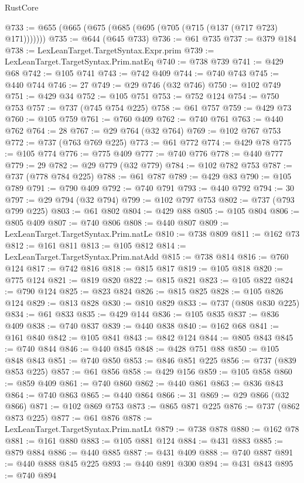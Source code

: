 \begin{lexlean}{RustCore}
\begin{coremodule}
{\begin{coremodule}
{{{{{{{{{{{{{{{{{{{{{{{{{{{{{{{{{{{{{{{{{{{{@733 := @655 (@665 (@675 (@685 (@695 (@705 (@715 (@137 (@717 @723) @171)))))))
@735 := @644 (@645 @733)
@736 := @61 @735
@737 := @379 @184
@738 := LexLeanTarget.TargetSyntax.Expr.prim
@739 := LexLeanTarget.TargetSyntax.Prim.natEq
@740 := @738 @739
@741 := @429 @68
@742 := @105 @741
@743 := @742 @409
@744 := @740 @743
@745 := @440 @744
@746 := 27
@749 := @29 @746 (@32 @746)
@750 := @102 @749
@751 := @429 @34
@752 := @105 @751
@753 := @752 @124
@754 := @750 @753
@757 := @737 (@745 @754 @225)
@758 := @61 @757
@759 := @429 @73
@760 := @105 @759
@761 := @760 @409
@762 := @740 @761
@763 := @440 @762
@764 := 28
@767 := @29 @764 (@32 @764)
@769 := @102 @767 @753
@772 := @737 (@763 @769 @225)
@773 := @61 @772
@774 := @429 @78
@775 := @105 @774
@776 := @775 @409
@777 := @740 @776
@778 := @440 @777
@779 := 29
@782 := @29 @779 (@32 @779)
@784 := @102 @782 @753
@787 := @737 (@778 @784 @225)
@788 := @61 @787
@789 := @429 @83
@790 := @105 @789
@791 := @790 @409
@792 := @740 @791
@793 := @440 @792
@794 := 30
@797 := @29 @794 (@32 @794)
@799 := @102 @797 @753
@802 := @737 (@793 @799 @225)
@803 := @61 @802
@804 := @429 @88
@805 := @105 @804
@806 := @805 @409
@807 := @740 @806
@808 := @440 @807
@809 := LexLeanTarget.TargetSyntax.Prim.natLe
@810 := @738 @809
@811 := @162 @73
@812 := @161 @811
@813 := @105 @812
@814 := LexLeanTarget.TargetSyntax.Prim.natAdd
@815 := @738 @814
@816 := @760 @124
@817 := @742 @816
@818 := @815 @817
@819 := @105 @818
@820 := @775 @124
@821 := @819 @820
@822 := @815 @821
@823 := @105 @822
@824 := @790 @124
@825 := @823 @824
@826 := @815 @825
@828 := @105 @826 @124
@829 := @813 @828
@830 := @810 @829
@833 := @737 (@808 @830 @225)
@834 := @61 @833
@835 := @429 @144
@836 := @105 @835
@837 := @836 @409
@838 := @740 @837
@839 := @440 @838
@840 := @162 @68
@841 := @161 @840
@842 := @105 @841
@843 := @842 @124
@844 := @805 @843
@845 := @740 @844
@846 := @440 @845
@848 := @428 @751 @88
@850 := @105 @848 @843
@851 := @740 @850
@853 := @846 @851 @225
@856 := @737 (@839 @853 @225)
@857 := @61 @856
@858 := @429 @156
@859 := @105 @858
@860 := @859 @409
@861 := @740 @860
@862 := @440 @861
@863 := @836 @843
@864 := @740 @863
@865 := @440 @864
@866 := 31
@869 := @29 @866 (@32 @866)
@871 := @102 @869 @753
@873 := @865 @871 @225
@876 := @737 (@862 @873 @225)
@877 := @61 @876
@878 := LexLeanTarget.TargetSyntax.Prim.natLt
@879 := @738 @878
@880 := @162 @78
@881 := @161 @880
@883 := @105 @881 @124
@884 := @431 @883
@885 := @879 @884
@886 := @440 @885
@887 := @431 @409
@888 := @740 @887
@891 := @440 @888 @845 @225
@893 := @440 @891 @300
@894 := @431 @843
@895 := @740 @894
}}}}}}}}}}}}}}}}}}}}}}}}}}}}}}}}}}}}}}}}}}}}
\end{coremodule}}
\end{coremodule}
\end{lexlean}
